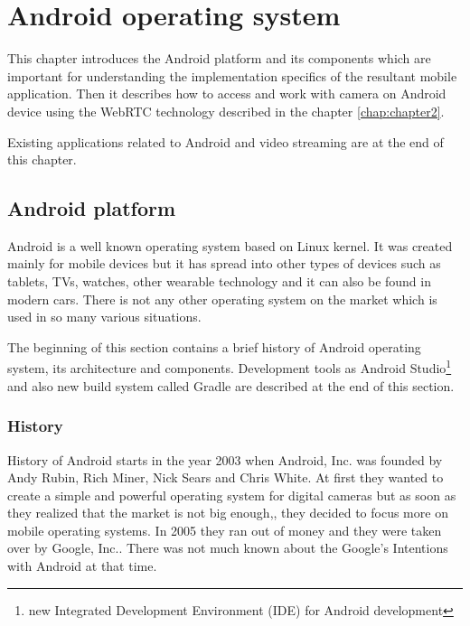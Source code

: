 \chapter{Android operating system}
\label{chap:chapter3}
This chapter introduces the Android platform and its components which are important for understanding the implementation specifics of the resultant mobile application. Then it describes how to access and work with camera on Android device using the WebRTC technology described in the chapter \ref{chap:chapter2}.

Existing applications related to Android and video streaming are at the end of this chapter.

\section{Android platform}
Android is a well known operating system based on Linux kernel. It was created mainly for mobile devices but it has spread into other types of devices such as tablets, TVs, watches, other wearable technology and it can also be found in modern cars. There is not any other operating system on the market which is used in so many various situations.

The beginning of this section contains a brief history of Android operating system, its architecture and components. Development tools as Android Studio\footnote{new Integrated Development Environment (IDE) for Android development} and also new build system called Gradle are described at the end of this section.



\subsection{History}
History of Android starts in the year 2003 when Android, Inc. was founded by Andy Rubin, Rich Miner, Nick Sears and Chris White. At first they wanted to create a simple and powerful operating system for digital cameras but as soon as they realized that the market is not big enough,, they decided to focus more on mobile operating systems. In 2005 they ran out of money and they were taken over by Google, Inc.. There was not much known about the Google's Intentions with Android at that time.

